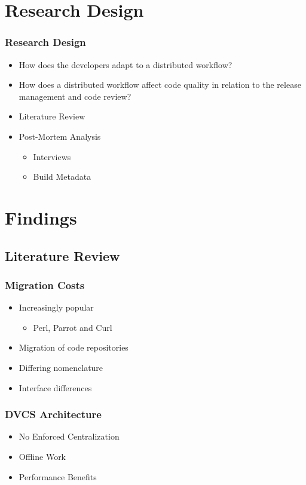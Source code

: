 \documentclass{beamer}
\begin{document}
\section{Research Design}

\begin{frame}
 \transwipe
 \frametitle{Research Design}
 \begin{itemize}
  \item How does the developers adapt to a distributed workflow?
  \item How does a distributed workflow affect code quality in
        relation to the release management and code review?
 \end{itemize}

 \pause

 \begin{itemize}
  \item Literature Review
  \item Post-Mortem Analysis
   \begin{itemize}
    \item Interviews
    \item Build Metadata
   \end{itemize}
 \end{itemize}
\end{frame}

\section{Findings}
\subsection{Literature Review}
\begin{frame}
 \transwipe
 \frametitle{Migration Costs}
 \begin{itemize}
  \item Increasingly popular
   \begin{itemize}
    \item Perl, Parrot and Curl
   \end{itemize}
  \item Migration of code repositories
  \item Differing nomenclature
  \item Interface differences
 \end{itemize}
\end{frame}

\begin{frame}
 \transwipe
 \frametitle{DVCS Architecture}
 \begin{itemize}
  \item No Enforced Centralization
  \item Offline Work
  \item Performance Benefits
 \end{itemize}
\end{frame}
\end{document}
